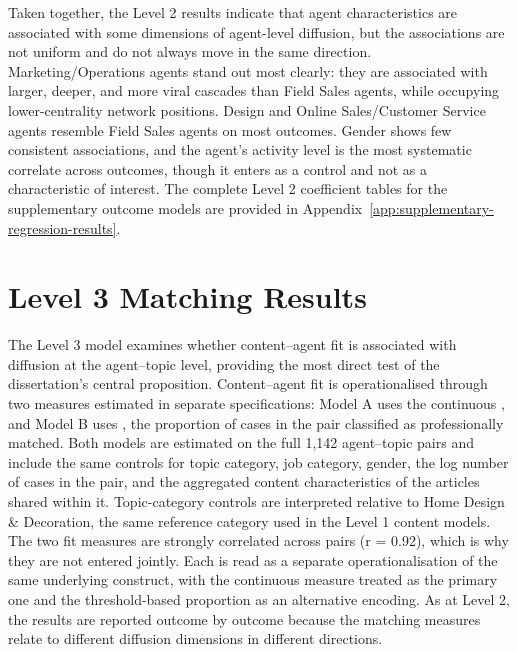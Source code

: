 Taken together, the Level 2 results indicate that agent characteristics are associated with some dimensions of agent-level diffusion, but the associations are not uniform and do not always move in the same direction. Marketing/Operations agents stand out most clearly: they are associated with larger, deeper, and more viral cascades than Field Sales agents, while occupying lower-centrality network positions. Design and Online Sales/Customer Service agents resemble Field Sales agents on most outcomes. Gender shows few consistent associations, and the agent's activity level is the most systematic correlate across outcomes, though it enters as a control and not as a characteristic of interest. The complete Level 2 coefficient tables for the supplementary outcome models are provided in Appendix~\ref{app:supplementary-regression-results}.

\section{Level 3 Matching Results}
\label{sec:6-4-level-3-matching-results}

The Level 3 model examines whether content–agent fit is associated with diffusion at the agent–topic level, providing the most direct test of the dissertation's central proposition. Content–agent fit is operationalised through two measures estimated in separate specifications: Model A uses the continuous , and Model B uses , the proportion of cases in the pair classified as professionally matched. Both models are estimated on the full 1,142 agent–topic pairs and include the same controls for topic category, job category, gender, the log number of cases in the pair, and the aggregated content characteristics of the articles shared within it. Topic-category controls are interpreted relative to Home Design \& Decoration, the same reference category used in the Level 1 content models. The two fit measures are strongly correlated across pairs (r = 0.92), which is why they are not entered jointly. Each is read as a separate operationalisation of the same underlying construct, with the continuous measure treated as the primary one and the threshold-based proportion as an alternative encoding. As at Level 2, the results are reported outcome by outcome because the matching measures relate to different diffusion dimensions in different directions.

